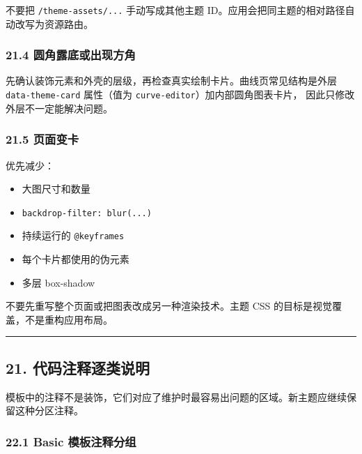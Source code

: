 \documentclass[UTF8,11pt,a4paper]{ctexart}
\providecommand{\tightlist}{%
  \setlength{\itemsep}{0pt}\setlength{\parskip}{0pt}}
\begin{document}
不要把 \texttt{/theme-assets/...} 手动写成其他主题
ID。应用会把同主题的相对路径自动改写为资源路由。

\subsubsection{21.4
圆角露底或出现方角}\label{214-ux5706ux89d2ux9732ux5e95ux6216ux51faux73b0ux65b9ux89d2}

先确认装饰元素和外壳的层级，再检查真实绘制卡片。曲线页常见结构是外层
\texttt{data-theme-card} 属性（值为 \texttt{curve-editor}）加内部圆角图表卡片，
因此只修改外层不一定能解决问题。

\subsubsection{21.5 页面变卡}\label{215-ux9875ux9762ux53d8ux5361}

优先减少：

\begin{itemize}
\tightlist
\item
  大图尺寸和数量
\item
  \texttt{backdrop-filter:\ blur(...)}
\item
  持续运行的 \texttt{@keyframes}
\item
  每个卡片都使用的伪元素
\item
  多层 box-shadow
\end{itemize}

不要先重写整个页面或把图表改成另一种渲染技术。主题 CSS
的目标是视觉覆盖，不是重构应用布局。

\begin{center}\rule{0.5\linewidth}{0.5pt}\end{center}

\subsection{21.
代码注释逐类说明}\label{21-ux4ee3ux7801ux6ce8ux91caux9010ux7c7bux8bf4ux660e}

模板中的注释不是装饰，它们对应了维护时最容易出问题的区域。新主题应继续保留这种分区注释。

\subsubsection{22.1 Basic
模板注释分组}\label{221-basic-ux6a21ux677fux6ce8ux91caux5206ux7ec4}
\end{document}
